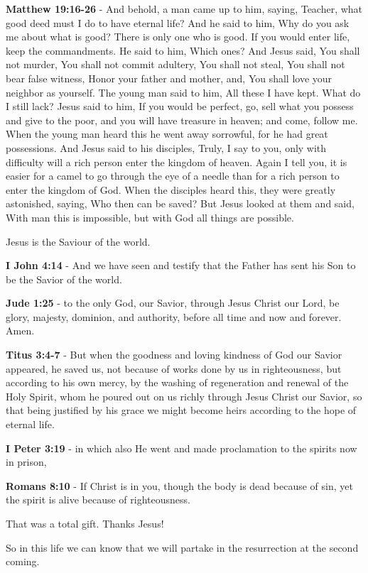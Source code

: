 \documentclass[11pt]{article}
\begin{document}
\textbf{Matthew 19:16-26} - And behold, a man came up to him, saying, Teacher, what good deed must I do to have eternal life? And he said to him, Why do you ask me about what is good? There is only one who is good. If you would enter life, keep the commandments. He said to him, Which ones? And Jesus said, You shall not murder, You shall not commit adultery, You shall not steal, You shall not bear false witness, Honor your father and mother, and, You shall love your neighbor as yourself. The young man said to him, All these I have kept. What do I still lack? Jesus said to him, If you would be perfect, go, sell what you possess and give to the poor, and you will have treasure in heaven; and come, follow me. When the young man heard this he went away sorrowful, for he had great possessions. And Jesus said to his disciples, Truly, I say to you, only with difficulty will a rich person enter the kingdom of heaven. Again I tell you, it is easier for a camel to go through the eye of a needle than for a rich person to enter the kingdom of God. When the disciples heard this, they were greatly astonished, saying, Who then can be saved? But Jesus looked at them and said, With man this is impossible, but with God all things are possible.

Jesus is the Saviour of the world.

\textbf{I John 4:14} - And we have seen and testify that the Father has sent his Son to be the Savior of the world.

\textbf{Jude 1:25} - to the only God, our Savior, through Jesus Christ our Lord, be glory, majesty, dominion, and authority, before all time and now and forever. Amen.

\textbf{Titus 3:4-7} - But when the goodness and loving kindness of God our Savior appeared, he saved us, not because of works done by us in righteousness, but according to his own mercy, by the washing of regeneration and renewal of the Holy Spirit, whom he poured out on us richly through Jesus Christ our Savior, so that being justified by his grace we might become heirs according to the hope of eternal life.

\textbf{I Peter 3:19} - in which also He went and made proclamation to the spirits now in prison,

\textbf{Romans 8:10} - If Christ is in you, though the body is dead because of sin, yet the spirit is alive because of righteousness.

That was a total gift. Thanks Jesus!

So in this life we can know that we will partake in the resurrection at the second coming.
\end{document}
